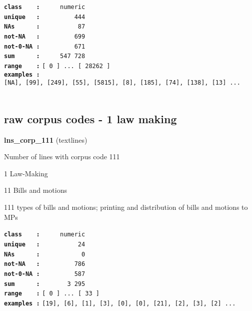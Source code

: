 \documentclass[]{article}
\begin{document}
\textbf{\texttt{class\ \ \ \ :}} \texttt{~~~~~numeric}\\
\textbf{\texttt{unique\ \ \ :}} \texttt{~~~~~~~~~444}\\
\textbf{\texttt{NAs\ \ \ \ \ \ :}} \texttt{~~~~~~~~~~87}\\
\textbf{\texttt{not-NA\ \ \ :}} \texttt{~~~~~~~~~699}\\
\textbf{\texttt{not-0-NA\ :}} \texttt{~~~~~~~~~671}\\
\textbf{\texttt{sum\ \ \ \ \ \ :}} \texttt{~~~~~547~728}\\
\textbf{\texttt{range\ \ \ \ :}}
\texttt{{[}\ 0\ {]}\ ...\ {[}\ 28262\ {]}}\\
\textbf{\texttt{examples\ :}}
\texttt{{[}NA{]},\ {[}99{]},\ {[}249{]},\ {[}55{]},\ {[}5815{]},\ {[}8{]},\ {[}185{]},\ {[}74{]},\ {[}138{]},\ {[}13{]}\ ...}\\

~

\subsection{raw corpus codes - 1 law
making}\label{raw-corpus-codes---1-law-making}

\textbf{lns\_corp\_111} (textlines)

Number of lines with corpus code 111

1 Law-Making

11 Bills and motions

111 types of bills and motions; printing and distribution of bills and
motions to MPs

\textbf{\texttt{class\ \ \ \ :}} \texttt{~~~~~numeric}\\
\textbf{\texttt{unique\ \ \ :}} \texttt{~~~~~~~~~~24}\\
\textbf{\texttt{NAs\ \ \ \ \ \ :}} \texttt{~~~~~~~~~~~0}\\
\textbf{\texttt{not-NA\ \ \ :}} \texttt{~~~~~~~~~786}\\
\textbf{\texttt{not-0-NA\ :}} \texttt{~~~~~~~~~587}\\
\textbf{\texttt{sum\ \ \ \ \ \ :}} \texttt{~~~~~~~3~295}\\
\textbf{\texttt{range\ \ \ \ :}}
\texttt{{[}\ 0\ {]}\ ...\ {[}\ 33\ {]}}\\
\textbf{\texttt{examples\ :}}
\texttt{{[}19{]},\ {[}6{]},\ {[}1{]},\ {[}3{]},\ {[}0{]},\ {[}0{]},\ {[}21{]},\ {[}2{]},\ {[}3{]},\ {[}2{]}\ ...}\\

~
\end{document}
